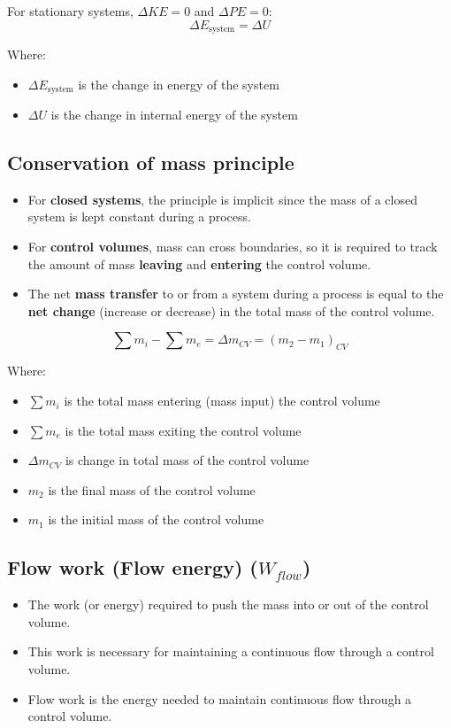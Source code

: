 \documentclass[11pt]{article}
\begin{document}
For stationary systems, \(\Delta KE = 0\) and \(\Delta PE = 0\):
\[\Delta E_{\text{system}} = \Delta U\]

Where:
\begin{itemize}
\item \(\Delta E_{\text{system}}\) is the change in energy of the system
\item \(\Delta U\) is the change in internal energy of the system
\end{itemize}

\subsection{Conservation of mass principle}
\label{sec:org0d74ace}
\begin{itemize}
\item For \textbf{closed systems}, the principle is implicit since the mass of a closed system is kept constant during a process.
\item For \textbf{control volumes}, mass can cross boundaries, so it is required to track the amount of mass \textbf{leaving} and \textbf{entering} the control volume.
\item The net \textbf{mass transfer} to or from a system during a process is equal to the \textbf{net change} (increase or decrease) in the total mass of the control volume.
\end{itemize}

\[\sum m_{i} - \sum m_{e} = \Delta m_{CV} = \left(m_2 - m_1 \right)_{CV}\]

Where:
\begin{itemize}
\item \(\sum m_{i}\) is the total mass entering (mass input) the control volume
\item \(\sum m_{e}\) is the total mass exiting the control volume
\item \(\Delta m_{CV}\) is change in total mass of the control volume
\item \(m_2\) is the final mass of the control volume
\item \(m_1\) is the initial mass of the control volume
\end{itemize}

\newpage

\subsection{Flow work (Flow energy) (\(W_{flow}\))}
\label{sec:orgf87ad56}
\begin{itemize}
\item The work (or energy) required to push the mass into or out of the control volume.
\item This work is necessary for maintaining a continuous flow through a control volume.
\item Flow work is the energy needed to maintain continuous flow through a control volume.
\end{itemize}
\end{document}
